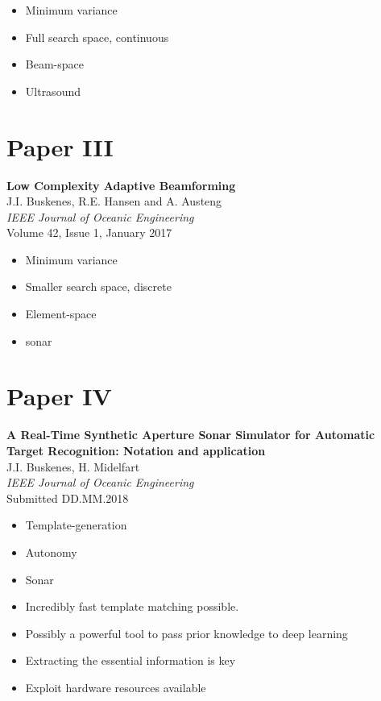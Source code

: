 \begin{itemize}
\item Minimum variance
\item Full search space, continuous
\item Beam-space
\item Ultrasound
\end{itemize}


\section{Paper III}\label{sec:paperIII} %
\textbf{Low Complexity Adaptive Beamforming}~\cite{Buskenes2014}\\
J.I. Buskenes, R.E. Hansen and A. Austeng\\
\textit{IEEE Journal of Oceanic Engineering}\\
Volume 42, Issue 1, January 2017


\begin{itemize}
\item Minimum variance
\item Smaller search space, discrete
\item Element-space
\item sonar
\end{itemize}



\section{Paper IV}\label{sec:paperIV} %
\textbf{A Real-Time Synthetic Aperture Sonar Simulator for Automatic Target Recognition: Notation and application}\\
J.I. Buskenes, H. Midelfart\\
\textit{IEEE Journal of Oceanic Engineering}\\
Submitted DD.MM.2018%

\begin{itemize}
\item Template-generation
\item Autonomy
\item Sonar
	\item Incredibly fast template matching possible.
	\item Possibly a powerful tool to pass prior knowledge to deep learning
	\item Extracting the essential information is key 
	\item Exploit hardware resources available
\end{itemize}



